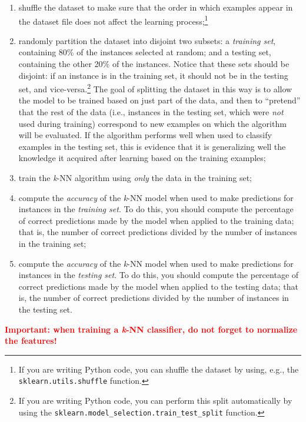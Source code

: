 \documentclass[]{article}
\begin{document}
\begin{enumerate}
    \begin{enumerate}
        \item shuffle the dataset to make sure that the order in which examples appear in the dataset file does not affect the learning process;\footnote{If you are writing Python code, you can shuffle the dataset by using, e.g., the \texttt{sklearn.utils.shuffle} function.}
        \item randomly partition the dataset into disjoint two subsets: a \textit{training set}, containing 80\% of the instances selected at random; and a testing set, containing the other 20\% of the instances. Notice that these sets should be disjoint: if an instance is in the training set, it should not be in the testing set, and vice-versa.\footnote{If you are writing Python code, you can perform this split automatically by using the \texttt{sklearn.model\_selection.train\_test\_split} function.} The goal of splitting the dataset in this way is to allow the model to be trained based on just part of the data, and then to ``pretend'' that the rest of the data (i.e., instances in the testing set, which were \textit{not} used during training) correspond to new examples on which the algorithm will be evaluated. If the algorithm performs well when used to classify examples in the testing set, this is evidence that it is generalizing well the knowledge it acquired after learning based on the training examples;
        \item train the \textit{k}-NN algorithm using \textit{only} the data in the training set;
        \item compute the \textit{accuracy} of the \textit{k}-NN model when used to make predictions for instances in the \textit{training set}. To do this, you should compute the percentage of correct predictions made by the model when applied to the training data; that is, the number of correct predictions divided by the number of instances in the training set;
        \item compute the \textit{accuracy} of the \textit{k}-NN model when used to make predictions for instances in the \textit{testing set}. To do this, you should compute the percentage of correct predictions made by the model when applied to the testing data; that is, the number of correct predictions divided by the number of instances in the testing set. 
    \end{enumerate}
    
    \textcolor{red}{\textbf{Important: when training a \textit{k}-NN classifier, do not forget to normalize the features!}}
    

\end{enumerate}
\end{document}
